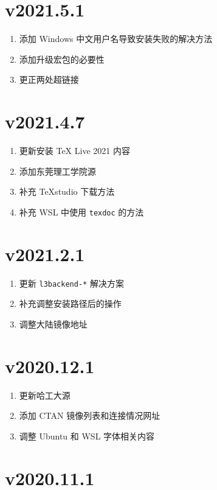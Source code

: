 \section*{v2021.5.1}

\begin{enumerate}
  \item 添加 Windows 中文用户名导致安装失败的解决方法
  \item 添加升级宏包的必要性
  \item 更正两处超链接
\end{enumerate}

\section*{v2021.4.7}

\begin{enumerate}
  \item 更新安装 \TeX{} Live 2021 内容
  \item 添加东莞理工学院源
  \item 补充 \TeX studio 下载方法
  \item 补充 WSL 中使用 \texttt{texdoc} 的方法
\end{enumerate}

\section*{v2021.2.1}

\begin{enumerate}
  \item 更新 \texttt{l3backend-*} 解决方案
  \item 补充调整安装路径后的操作
  \item 调整大陆镜像地址
\end{enumerate}
\section*{v2020.12.1}

\begin{enumerate}
  \item 更新哈工大源
  \item 添加 CTAN 镜像列表和连接情况网址
  \item 调整 Ubuntu 和 WSL 字体相关内容
\end{enumerate}

\section*{v2020.11.1}

